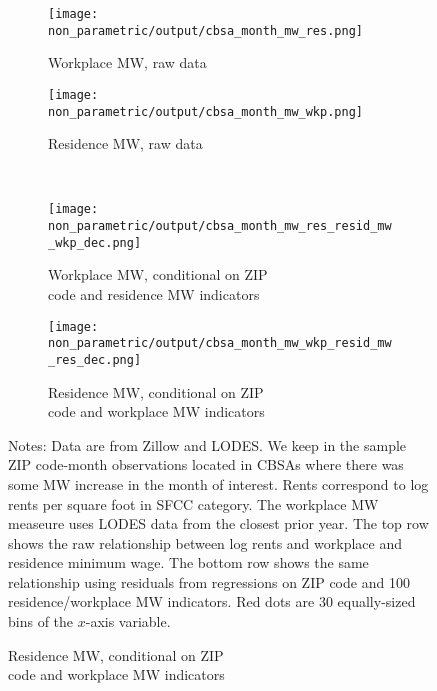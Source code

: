 \begin{figure}[h!]
    \centering
    \caption{Relationship between log rents and minimum wage}
               \label{fig:rents_mw_non_parametric}
    \begin{subfigure}{0.45\textwidth}
        \caption{Workplace MW, raw data}
        \texttt{[image: non\_parametric/output/cbsa\_month\_mw\_res.png]}
    \end{subfigure}%
    \begin{subfigure}{0.45\textwidth}
        \caption{Residence MW, raw data}
        \texttt{[image: non\_parametric/output/cbsa\_month\_mw\_wkp.png]}
    \end{subfigure}\\
    \begin{subfigure}{0.45\textwidth}
        \caption{Workplace MW, conditional on ZIP\\code and residence
        MW indicators}

        \texttt{[image: non\_parametric/output/cbsa\_month\_mw\_res\_resid\_mw\_wkp\_dec.png]}
    \end{subfigure}%
    \begin{subfigure}{0.45\textwidth}
        \caption{Residence MW, conditional on ZIP\\code and workplace
        MW indicators}

        \texttt{[image: non\_parametric/output/cbsa\_month\_mw\_wkp\_resid\_mw\_res\_dec.png]}
    \end{subfigure} 

    \begin{minipage}{.95\textwidth} \footnotesize
        \vspace{3mm}
        Notes:
        Data are from Zillow and LODES. We keep in the sample ZIP code-month
        observations located in CBSAs where there was some MW increase in the 
        month of interest. Rents correspond to log rents per square foot in
        SFCC category. The workplace MW measeure uses LODES data from the 
        closest prior year. The top row shows the raw relationship between log 
        rents and workplace and residence minimum wage. The bottom row
        shows the same relationship using residuals from regressions on ZIP 
        code and 100 residence/workplace MW indicators. Red dots are 30 
        equally-sized bins of the $x$-axis variable. 
    \end{minipage}
\end{figure}